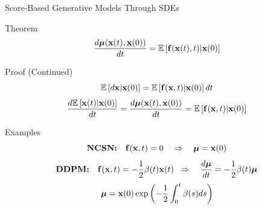 \documentclass{beamer}
\begin{document}
\begin{frame}{Score-Based Generative Models Through SDEs}
	\begin{block}{Theorem}
		\vspace{-0.3cm}
		\[
			\frac{d \boldsymbol{\mu}(\mathbf{x}(t), \mathbf{x}(0))}{dt} = \mathbb{E} \left[ \mathbf{f}(\mathbf{x}(t), t) | \mathbf{x}(0)\right]
		\]
		\vspace{-0.5cm}
	\end{block}
    \eqpause
	\begin{block}{Proof (Continued)}
		\vspace{-0.3cm}
		\[
			\mathbb{E}\left[d\mathbf{x} | \mathbf{x}(0) \right] = \mathbb{E}\left[\mathbf{f}(\mathbf{x}, t) | \mathbf{x}(0) \right] dt
		\]
        \eqpause
		\[
			\frac{d \mathbb{E}\left[\mathbf{x}(t) | \mathbf{x}(0) \right]}{dt} = \frac{d \boldsymbol{\mu}(\mathbf{x}(t), \mathbf{x}(0))}{dt} = \mathbb{E}\left[\mathbf{f}(\mathbf{x}, t) | \mathbf{x}(0) \right] 
		\]
	\end{block}
    \eqpause
	\vspace{-0.3cm}
	\begin{block}{Examples}
		\vspace{-0.5cm}
		\[
			\textbf{NCSN:}\quad	\mathbf{f}(\mathbf{x}, t) = 0 \quad \Rightarrow \quad \boldsymbol{\mu} = \mathbf{x}(0)
		\]
        \eqpause
		\vspace{-0.5cm}
		\[
			\textbf{DDPM:}\quad \mathbf{f}(\mathbf{x}, t) = - \frac{1}{2} \beta(t) \mathbf{x}(t)\;\;   \Rightarrow\quad \frac{d \boldsymbol{\mu}}{dt} = - \frac{1}{2} \beta(t) \boldsymbol{\mu}
		\]
        \eqpause
		\vspace{-0.3cm}
		\[
			\boldsymbol{\mu} = \mathbf{x}(0) \exp\left(- \frac{1}{2} \int_0^t \beta(s)ds\right)
		\]
	\end{block}
\end{frame}
\end{document}
